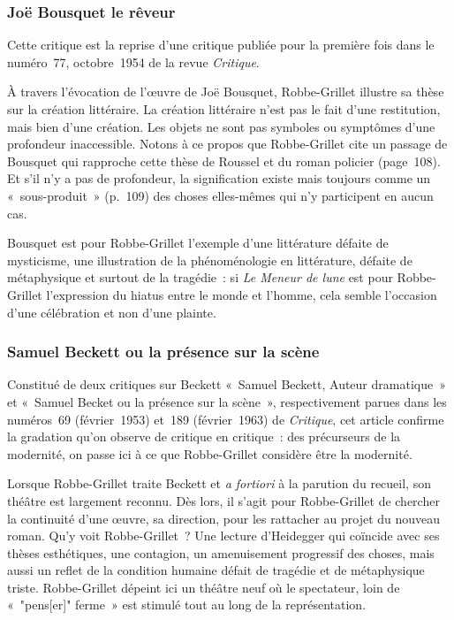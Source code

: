 \documentclass[12pt, a4paper]{article}
\begin{document}
\subsubsection{Joë Bousquet le rêveur}
Cette critique est la reprise d'une critique publiée pour la première fois dans le numéro~77, octobre~1954 de la revue \textit{Critique}.

À travers l'évocation de l'œuvre de Joë Bousquet, Robbe-Grillet illustre sa thèse sur la création littéraire. La création littéraire n'est pas le fait d'une restitution, mais bien d'une création. Les objets ne sont pas symboles ou symptômes d'une profondeur inaccessible. Notons à ce propos que Robbe-Grillet cite un passage de Bousquet qui rapproche cette thèse de Roussel et du roman policier (page~108). Et s'il n'y a pas de profondeur, la signification existe mais toujours comme un «~sous-produit~» (p.~109) des choses elles-mêmes qui n'y participent en aucun cas.

Bousquet est pour Robbe-Grillet l'exemple d'une littérature défaite de mysticisme, une illustration de la phénoménologie en littérature, défaite de métaphysique et surtout de la tragédie~: si \textit{Le Meneur de lune} est pour Robbe-Grillet l'expression du hiatus entre le monde et l'homme, cela semble l'occasion d'une célébration et non d'une plainte.


\subsubsection{Samuel Beckett ou la présence sur la scène}
Constitué de deux critiques sur Beckett «~Samuel Beckett, Auteur dramatique~» et «~Samuel Becket ou la présence sur la scène~», respectivement parues dans les numéros~69 (février~1953) et~189 (février~1963) de \textit{Critique}, cet article confirme la gradation qu'on observe de critique en critique~: des précurseurs de la modernité, on passe ici à ce que Robbe-Grillet considère être la modernité.

Lorsque Robbe-Grillet traite Beckett et \textit{a fortiori} à la parution du recueil, son théâtre est largement reconnu. Dès lors, il s'agit pour Robbe-Grillet de chercher la continuité d'une œuvre, sa direction, pour les rattacher au projet du nouveau roman. Qu'y voit Robbe-Grillet~? Une lecture d'Heidegger qui coïncide avec ses thèses esthétiques, une contagion, un amenuisement progressif des choses, mais aussi un reflet de la condition humaine défait de tragédie et de métaphysique triste. Robbe-Grillet dépeint ici un théâtre neuf où le spectateur, loin de «~"pens[er]" ferme~» est stimulé tout au long de la représentation.
\end{document}
